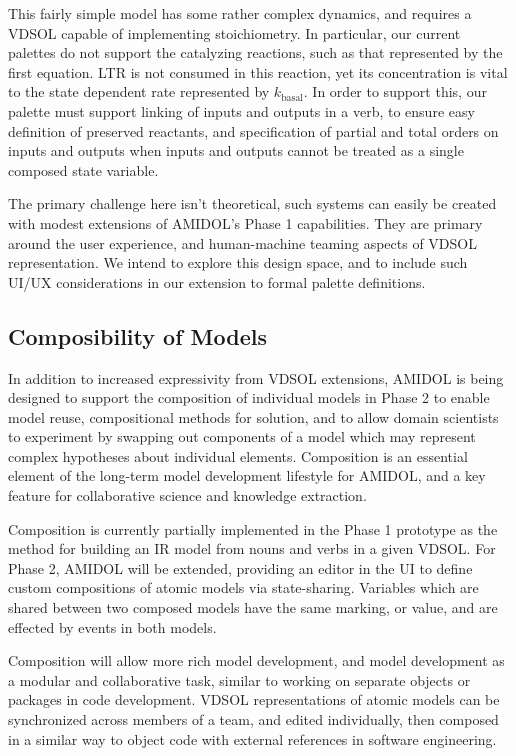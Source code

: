 \documentclass[11pt]{article}
\newcommand{\amidol}{\textsc{AMIDOL}}
\begin{document}
This fairly simple model has some rather complex dynamics, and
requires a VDSOL capable of implementing stoichiometry.  In particular,
our current palettes do not support the catalyzing reactions, such as
that represented by the first equation.  LTR is not consumed in this
reaction, yet its concentration is vital to the state dependent rate
represented by $k_{\mathrm{basal}}$.  In order to support this, our
palette must support linking of inputs and outputs in a verb, to
ensure easy definition of preserved reactants, and specification of
partial and total orders on inputs and outputs when inputs and outputs
cannot be treated as a single composed state variable.

The primary challenge here isn't theoretical, such systems can easily
be created with modest extensions of \amidol{}'s Phase 1
capabilities.  They are primary around the user experience, and
human-machine teaming aspects of VDSOL representation.  We intend to
explore this design space, and to include such UI/UX considerations in
our extension to formal palette definitions.

\subsection{Composibility of Models}

In addition to increased expressivity from VDSOL extensions, \amidol{}
is being designed to support the composition of individual models in
Phase 2 to enable model reuse, compositional methods for solution, and
to allow domain scientists to experiment by
swapping out components of a model which may represent complex
hypotheses about individual elements.  Composition is an essential
element of the long-term model development lifestyle for \amidol{},
and a key feature for collaborative science and knowledge extraction.

Composition is currently partially implemented in the Phase 1
prototype as the method for building an IR model from nouns and verbs
in a given VDSOL.  For Phase 2, \amidol{} will be extended, providing
an editor in the UI to define custom compositions of atomic models via
state-sharing.  Variables which are shared between two composed models
have the same marking, or value, and are effected by events in both
models.

Composition will allow more rich model development, and model
development as a modular and collaborative task, similar to working on
separate objects or packages in code development.  VDSOL
representations of atomic models can be synchronized across members of
a team, and edited individually, then composed in a similar way to
object code with external references in software engineering.
\end{document}

